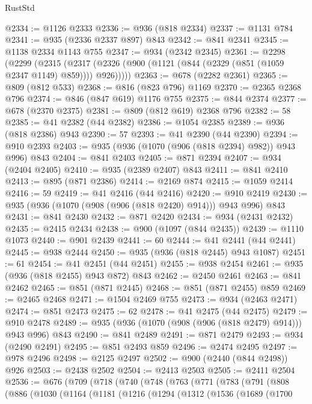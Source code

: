 \begin{lexlean}{RustStd}
\begin{coremodule}
@2334 := @1126 @2333
@2336 := @936 (@818 @2334)
@2337 := @1131 @784
@2341 := @935 (@2336 @2337 @897) @843
@2342 := @841 @2341
@2345 := @1138 @2334 @1143 @755
@2347 := @934 (@2342 @2345)
@2361 := @2298
    (@2299
      (@2315 (@2317 (@2326 (@900 (@1121 (@844 (@2329 (@851 (@1059 @2347 @1149) @859)))) @926)))))
@2363 := @678 (@2282 @2361)
@2365 := @809 (@812 @533)
@2368 := @816 (@823 @796) @1169
@2370 := @2365 @2368 @796
@2374 := @846 (@847 @619) @1176 @755
@2375 := @844 @2374
@2377 := @678 (@2370 @2375)
@2381 := @809 (@812 @619) @2368 @796
@2382 := 58
@2385 := @41 @2382 (@44 @2382)
@2386 := @1054 @2385
@2389 := @936 (@818 @2386) @943
@2390 := 57
@2393 := @41 @2390 (@44 @2390)
@2394 := @910 @2393
@2403 := @935 (@936 (@1070 (@906 (@818 @2394) @982)) @943 @996) @843
@2404 := @841 @2403
@2405 := @871 @2394
@2407 := @934 (@2404 @2405)
@2410 := @935 (@2389 @2407) @843
@2411 := @841 @2410
@2413 := @895 (@871 @2386)
@2414 := @2169 @874
@2415 := @1059 @2414
@2416 := 59
@2419 := @41 @2416 (@44 @2416)
@2420 := @910 @2419
@2430 := @935 (@936 (@1070 (@908 (@906 (@818 @2420) @914))) @943 @996) @843
@2431 := @841 @2430
@2432 := @871 @2420
@2434 := @934 (@2431 @2432)
@2435 := @2415 @2434
@2438 := @900 (@1097 (@844 @2435))
@2439 := @1110 @1073
@2440 := @901 @2439
@2441 := 60
@2444 := @41 @2441 (@44 @2441)
@2445 := @938 @2444
@2450 := @935 (@936 (@818 @2445) @943 @1087)
@2451 := 61
@2454 := @41 @2451 (@44 @2451)
@2455 := @938 @2454
@2461 := @935 (@936 (@818 @2455) @943 @872) @843
@2462 := @2450 @2461
@2463 := @841 @2462
@2465 := @851 (@871 @2445)
@2468 := @851 (@871 @2455) @859
@2469 := @2465 @2468
@2471 := @1504 @2469 @755
@2473 := @934 (@2463 @2471)
@2474 := @851 @2473
@2475 := 62
@2478 := @41 @2475 (@44 @2475)
@2479 := @910 @2478
@2489 := @935 (@936 (@1070 (@908 (@906 (@818 @2479) @914))) @943 @996) @843
@2490 := @841 @2489
@2491 := @871 @2479
@2493 := @934 (@2490 @2491)
@2495 := @851 @2493 @859
@2496 := @2474 @2495
@2497 := @978 @2496
@2498 := @2125 @2497
@2502 := @900 (@2440 (@844 @2498)) @926
@2503 := @2438 @2502
@2504 := @2413 @2503
@2505 := @2411 @2504
@2536 := @676
    (@709
      (@718
        (@740
          (@748
            (@763
              (@771
                (@783
                  (@791
                    (@808
                      (@886
                        (@1030
                          (@1164
                            (@1181
                              (@1216
                                (@1294
                                  (@1312
                                    (@1536
                                      (@1689
                                        (@1700

\end{coremodule}
\end{lexlean}
